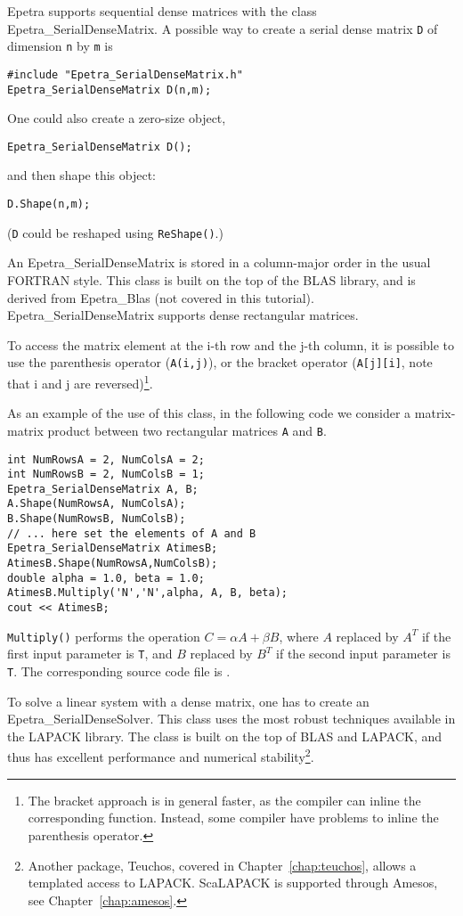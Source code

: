 Epetra supports sequential dense matrices with the class
Epetra\_SerialDenseMatrix.  A possible way to create a serial dense
matrix \verb!D! of dimension \verb!n!  by \verb!m! is
\begin{verbatim}
#include "Epetra_SerialDenseMatrix.h"
Epetra_SerialDenseMatrix D(n,m);
\end{verbatim}
One could also create a zero-size object, 
\begin{verbatim}
Epetra_SerialDenseMatrix D();
\end{verbatim}
and then shape this object:
\begin{verbatim}
D.Shape(n,m);
\end{verbatim}
({\tt D} could be reshaped using \verb!ReShape()!.)

An Epetra\_SerialDenseMatrix is stored in a column-major order in the
usual FORTRAN style. This class is built on the top of the BLAS library,
and is derived from Epetra\_Blas (not covered in this tutorial).
Epetra\_SerialDenseMatrix supports dense rectangular matrices.

\smallskip

To access the matrix element at the i-th row and the j-th column, it is
possible to use the parenthesis operator (\verb!A(i,j)!), or the bracket
operator (\verb!A[j][i]!, note that i and j are reversed)\footnote{The
  bracket approach is in general faster, as the compiler can inline the
  corresponding function. Instead, some compiler have problems to inline
  the parenthesis operator.}.

As an example of the use of this class, in the following code we
consider a matrix-matrix product between two rectangular matrices
\verb!A! and \verb!B!. 
\begin{verbatim}
int NumRowsA = 2, NumColsA = 2;
int NumRowsB = 2, NumColsB = 1;
Epetra_SerialDenseMatrix A, B;
A.Shape(NumRowsA, NumColsA);
B.Shape(NumRowsB, NumColsB);
// ... here set the elements of A and B
Epetra_SerialDenseMatrix AtimesB;
AtimesB.Shape(NumRowsA,NumColsB);  
double alpha = 1.0, beta = 1.0;
AtimesB.Multiply('N','N',alpha, A, B, beta);
cout << AtimesB;
\end{verbatim}
\verb!Multiply()! performs the operation $C = \alpha A + \beta B$, where
$A$ replaced by $A^T$ if the first input parameter is \verb!T!, and $B$
replaced by $B^T$ if the second input parameter is \verb!T!.  The
corresponding source code file is .

\smallskip

To solve a linear system with a dense matrix, one has to create an
Epetra\_SerialDenseSolver. This class uses the most robust techniques
available in the LAPACK library. The class is built on the top of BLAS
and LAPACK, and thus has excellent performance and numerical
stability\footnote{Another package, Teuchos, covered in
  Chapter~\ref{chap:teuchos}, allows a templated access to LAPACK.
  ScaLAPACK is supported through Amesos, see
  Chapter~\ref{chap:amesos}.}.

